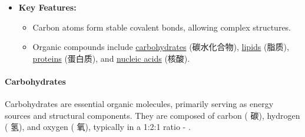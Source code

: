 \begin{itemize}
\begin{figure}[H]
{        diagrams we use one of several different ways to draw them.}
    \end{figure}
    \item \textbf{Key Features:}
    \begin{itemize}
        \item Carbon atoms form stable covalent bonds, allowing complex structures.
        \item Organic compounds include \underline{carbohydrates} (碳水化合物), \underline{lipids} (脂质), \underline{proteins}
        (蛋白质), and \underline{nucleic acids} (核酸).
    \end{itemize}
\end{itemize}

\paragraph{Carbohydrates}
Carbohydrates are essential organic molecules, primarily serving as energy sources and structural components. They are composed
of carbon ( 碳), hydrogen ( 氢), and oxygen ( 氧), typically in a 1:2:1 ratio - .

